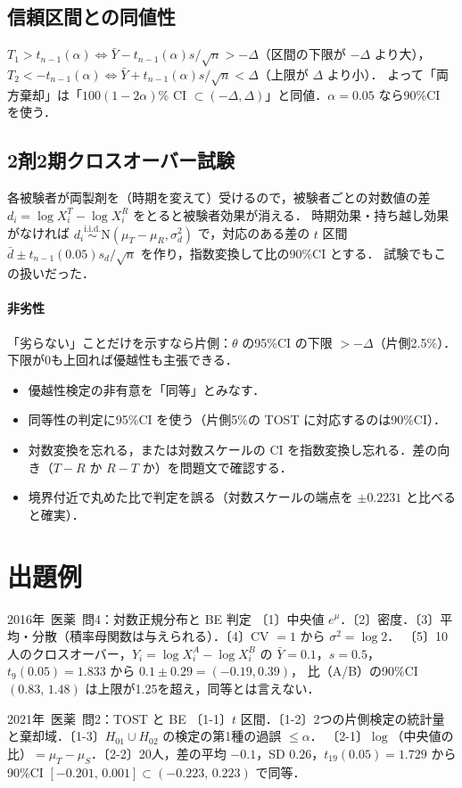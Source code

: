 \documentclass[a4paper,11pt,openany]{ltjsbook}
\newcommand{\kakomon}[2]{\mbox{#1年 医薬 問#2}}
\newcommand{\iid}{\overset{\text{i.i.d.}}{\sim}}
\newcommand{\Normal}{\mathrm{N}}
\begin{document}
\subsection{信頼区間との同値性}
$T_1>t_{n-1}(\alpha)\iff\bar Y-t_{n-1}(\alpha)s/\sqrt n>-\Delta$（区間の下限が $-\Delta$ より大），
$T_2<-t_{n-1}(\alpha)\iff\bar Y+t_{n-1}(\alpha)s/\sqrt n<\Delta$（上限が $\Delta$ より小）．
よって「両方棄却」は「$100(1-2\alpha)\%$ CI $\subset(-\Delta,\Delta)$」と同値．$\alpha=0.05$ なら90\%CI を使う．

\subsection{2剤2期クロスオーバー試験}
各被験者が両製剤を（時期を変えて）受けるので，被験者ごとの対数値の差 $d_i=\log X_i^T-\log X_i^R$ をとると被験者効果が消える．
時期効果・持ち越し効果がなければ $d_i\iid\Normal(\mu_T-\mu_R,\sigma_d^2)$ で，対応のある差の $t$ 区間 $\bar d\pm t_{n-1}(0.05)s_d/\sqrt n$ を作り，指数変換して比の90\%CI とする．
試験でもこの扱いだった．
\paragraph{非劣性}
「劣らない」ことだけを示すなら片側：$\theta$ の95\%CI の下限 $>-\Delta$（片側2.5\%）．下限が0も上回れば優越性も主張できる．

\begin{warnbox}
\begin{itemize}
\item 優越性検定の非有意を「同等」とみなす．
\item 同等性の判定に95\%CI を使う（片側5\%の TOST に対応するのは90\%CI）．
\item 対数変換を忘れる，または対数スケールの CI を指数変換し忘れる．差の向き（$T-R$ か $R-T$ か）を問題文で確認する．
\item 境界付近で丸めた比で判定を誤る（対数スケールの端点を $\pm0.2231$ と比べると確実）．
\end{itemize}
\end{warnbox}

\section{出題例}\label{sec:m10-shutsudai}
\begin{shutsudai}{\kakomon{2016}{4}：対数正規分布と BE 判定}
〔1〕中央値 $e^\mu$．〔2〕密度．〔3〕平均・分散（積率母関数は与えられる）．〔4〕CV $=1$ から $\sigma^2=\log2$．
〔5〕10人のクロスオーバー，$Y_i=\log X_i^A-\log X_i^B$ の $\bar Y=0.1$，$s=0.5$，$t_9(0.05)=1.833$ から $0.1\pm0.29=(-0.19,0.39)$，
比（A/B）の90\%CI $(0.83,\,1.48)$ は上限が1.25を超え，同等とは言えない．
\end{shutsudai}
\begin{shutsudai}{\kakomon{2021}{2}：TOST と BE}
〔1-1〕$t$ 区間．〔1-2〕2つの片側検定の統計量と棄却域．〔1-3〕$H_{01}\cup H_{02}$ の検定の第1種の過誤 $\le\alpha$．
〔2-1〕$\log$（中央値の比）$=\mu_T-\mu_S$．〔2-2〕20人，差の平均 $-0.1$，SD $0.26$，$t_{19}(0.05)=1.729$ から90\%CI $[-0.201,\,0.001]\subset(-0.223,\,0.223)$ で同等．
\end{shutsudai}
\end{document}
